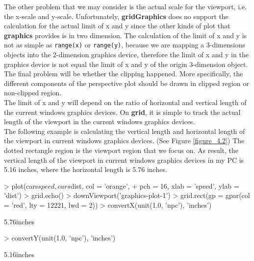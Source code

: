 \documentclass{report}
\begin{document}
The other problem that we may consider is the actual scale for the viewport, i.e. the x-scale and y-scale. Unfortunately, \textbf{gridGraphics} does no support the calculation for the actual limit of x and y since the other kinds of plot that \textbf{graphics} provides is in two dimension. The calculation of the limit of x and y is not as simple as \texttt{range(x)} or \texttt{range(y)}, because we are mapping a 3-dimensions objects into the 2-dimension graphics device, therefore the limit of x and y in the graphics device is not equal the limit of x and y of the origin 3-dimension object.\\

The final problem will be whether the clipping happened. More specifically, the different components of the perspective plot should be drawn in clipped region or non-clipped region.\\

The limit of x and y will depend on the ratio of horizontal and vertical length of the current windows graphics devices. On \textbf{grid}, it is simple to track the actual length of the viewport in the current windows graphics devices. \\

The following example is calculating the vertical length and horizontal length of the viewport in current windows graphics devices. (See Figure \ref{figure_4.2}) The dotted rectangle region is the viewport region that we focus on. As result, the vertical length of the viewport in current windows graphics devices in my PC is 5.16 inches, where the horizontal length is 5.76 inches. \\
\begin{Schunk}
\begin{Sinput}
> plot(cars$speed, cars$dist, col = 'orange', 
+       pch = 16, xlab = 'speed', ylab = 'dist')
> grid.echo()
> downViewport('graphics-plot-1')
> grid.rect(gp = gpar(col = 'red', lty = 12221, lwd = 2))
> convertX(unit(1.0, 'npc'), 'inches')
\end{Sinput}
\begin{Soutput}
[1] 5.76inches
\end{Soutput}
\begin{Sinput}
> convertY(unit(1.0, 'npc'), 'inches')
\end{Sinput}
\begin{Soutput}
[1] 5.16inches
\end{Soutput}
\end{Schunk}
\end{document}
